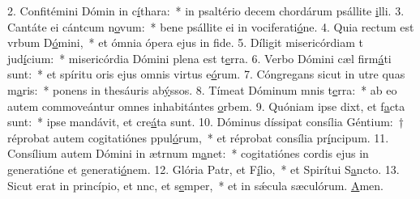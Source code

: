 2. Confitémini Dómin in c\uline{í}thara:~* in psaltério decem chordárum psállite \uline{i}lli.
3. Cantáte ei cántcum n\uline{o}vum:~* bene psállite ei in vociferati\uline{ó}ne.
4. Quia rectum est vrbum D\uline{ó}mini,~* et ómnia ópera ejus in f\uline{i}de.
5. Díligit misericórdiam t jud\uline{í}cium:~* misericórdia Dómini plena est t\uline{e}rra.
6. Verbo Dómini cæl firm\uline{á}ti sunt:~* et spíritu oris ejus omnis virtus e\uline{ó}rum.
7. Cóngregans sicut in utre quas m\uline{a}ris:~* ponens in thesáuris ab\uline{ý}ssos.
8. Tímeat Dóminum mnis t\uline{e}rra:~* ab eo autem commoveántur omnes inhabitántes \uline{o}rbem.
9. Quóniam ipse dixt, et f\uline{a}cta sunt:~* ipse mandávit, et cre\uline{á}ta sunt.
10. Dóminus díssipat consília Géntium:~† réprobat autem cogitatiónes ppul\uline{ó}rum,~* et réprobat consília pr\uline{í}ncipum.
11. Consílium autem Dómini in ætrnum m\uline{a}net:~* cogitatiónes cordis ejus in generatióne et generati\uline{ó}nem.
12. Glória Patr, et F\uline{í}lio,~* et Spirítui S\uline{a}ncto.
13. Sicut erat in princípio, et nnc, et s\uline{e}mper,~* et in sǽcula sæculórum. \uline{A}men.
